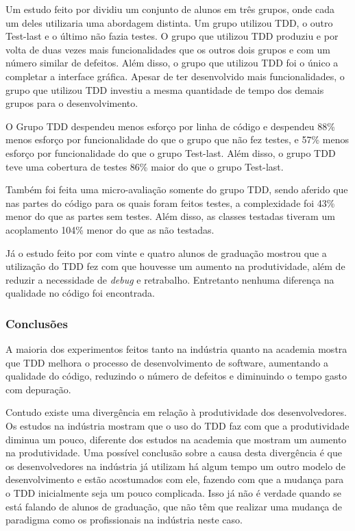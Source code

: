 Um estudo feito por  dividiu um conjunto de alunos em três grupos, onde cada um deles utilizaria uma abordagem distinta. Um grupo utilizou TDD, o outro Test-last e o último não fazia testes. O grupo que utilizou TDD produziu e por volta de duas vezes  mais funcionalidades que os outros dois grupos e com um número similar de defeitos. Além disso, o grupo que utilizou TDD foi o único a completar a interface gráfica. Apesar de ter desenvolvido mais funcionalidades, o grupo que utilizou TDD investiu a mesma quantidade de tempo dos demais grupos para o desenvolvimento.

O Grupo TDD despendeu menos esforço por linha de código e despendeu 88\% menos esforço por funcionalidade do que o grupo que não fez testes, e 57\% menos esforço por funcionalidade do que o grupo Test-last. Além disso, o grupo TDD teve uma cobertura de testes 86\% maior do que o grupo Test-last.

Também foi feita uma micro-avaliação somente do grupo TDD, sendo aferido que nas partes do código para os quais foram feitos testes, a complexidade foi 43\% menor do que as partes sem testes. Além disso, as classes testadas tiveram um acoplamento 104\% menor do que as não testadas.

Já o estudo feito por  com vinte e quatro alunos de graduação mostrou que a utilização do TDD fez com que houvesse um aumento na produtividade, além de reduzir a necessidade de \textit{debug} e retrabalho. Entretanto nenhuma diferença na qualidade no código foi encontrada.


\subsubsection{Conclusões} %
\label{sub:conclusoes}

A maioria dos experimentos feitos tanto na indústria quanto na academia mostra que TDD melhora o processo de desenvolvimento de software, aumentando a qualidade do código, reduzindo o número de defeitos e diminuindo o tempo gasto com depuração.

Contudo existe uma divergência em relação à produtividade dos desenvolvedores. Os estudos na indústria mostram que o uso do TDD faz com que a produtividade diminua um pouco, diferente dos estudos na academia que mostram um aumento na produtividade. Uma possível conclusão sobre a causa desta divergência é que os desenvolvedores na indústria já utilizam há algum tempo um outro modelo de desenvolvimento e estão acostumados com ele, fazendo com que a mudança para o TDD inicialmente seja um pouco complicada. Isso já não é verdade quando se está falando de alunos de graduação, que não têm que realizar uma mudança de paradigma como os profissionais na indústria neste caso.

